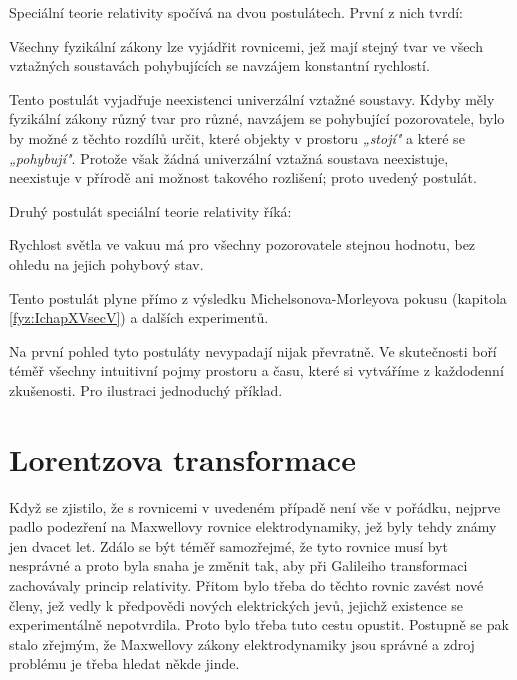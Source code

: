       Speciální teorie relativity spočívá na dvou postulátech. První z nich tvrdí: 
      \begin{mdframed}[style=mdnote]
        Všechny fyzikální zákony lze vyjádřit rovnicemi, jež mají stejný tvar ve všech vztažných
        soustavách pohybujících se navzájem konstantní rychlostí. 
      \end{mdframed}
      Tento postulát vyjadřuje neexistenci univerzální vztažné soustavy. Kdyby měly fyzikální zákony
      různý tvar pro různé, navzájem se pohybující pozorovatele, bylo by možné z těchto rozdílů
      určit, které objekty v prostoru \emph{„stojí"} a které se \emph{„pohybují"}. Protože však
      žádná univerzální vztažná soustava neexistuje, neexistuje v přírodě ani možnost takového
      rozlišení; proto uvedený postulát.

      Druhý postulát speciální teorie relativity říká:
      \begin{mdframed}[style=mdnote] 
        Rychlost světla ve vakuu má pro všechny pozorovatele stejnou hodnotu, bez ohledu na jejich 
        pohybový stav. 
      \end{mdframed}
      Tento postulát plyne přímo z výsledku Michelsonova-Morleyova pokusu (kapitola
      \ref{fyz:IchapXVsecV}) a dalších experimentů.

      Na první pohled tyto postuláty nevypadají nijak převratně. Ve skutečnosti boří téměř všechny
      intuitivní pojmy prostoru a času, které si vytváříme z každodenní zkušenosti. Pro ilustraci
      jednoduchý příklad. 
      

    
  \section{Lorentzova transformace}\label{fyz:IchapXVsecIV}
    Když se zjistilo, že s rovnicemi v uvedeném případě není vše v pořádku, nejprve padlo podezření 
    na Maxwellovy rovnice elektrodynamiky, jež byly tehdy známy jen dvacet let. Zdálo se být téměř 
    samozřejmé, že tyto rovnice musí byt nesprávné a proto byla snaha je změnit tak, aby při 
    Galileiho transformaci zachovávaly princip relativity. Přitom bylo třeba do těchto rovnic 
    zavést nové členy, jež vedly k předpovědi nových elektrických jevů, jejichž existence se 
    experimentálně nepotvrdila. Proto bylo třeba tuto cestu opustit. Postupně se pak stalo zřejmým, 
    že Maxwellovy zákony elektrodynamiky jsou správné a zdroj problému je třeba hledat někde 
    jinde.  
    
